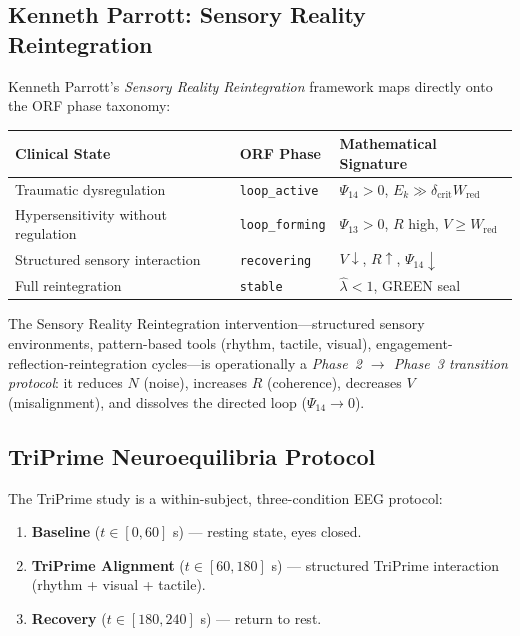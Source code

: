 \documentclass[12pt,a4paper]{article}
\theoremstyle{plain}
\theoremstyle{definition}
\newcommand{\hatlambda}{\hat{\lambda}}
\renewcommand{\Psi}{\varPsi}
\begin{document}
\subsection{Kenneth Parrott: Sensory Reality Reintegration}
\label{sec:clinical:srr}

Kenneth Parrott's \emph{Sensory Reality Reintegration} framework maps directly onto the
ORF phase taxonomy:

\begin{center}
\begin{tabular}{@{}lll@{}}
  \toprule
  Clinical State & ORF Phase & Mathematical Signature \\
  \midrule
  Traumatic dysregulation & \texttt{loop\_active} & $\Psi_{14} > 0$, $E_k \gg \delta_{\mathrm{crit}} W_{\mathrm{red}}$ \\
  Hypersensitivity without regulation & \texttt{loop\_forming} & $\Psi_{13} > 0$, $R$ high, $V \geq W_{\mathrm{red}}$ \\
  Structured sensory interaction & \texttt{recovering} & $V\downarrow$, $R\uparrow$, $\Psi_{14}\downarrow$ \\
  Full reintegration & \texttt{stable} & $\hatlambda < 1$, GREEN seal \\
  \bottomrule
\end{tabular}
\end{center}

\noindent The Sensory Reality Reintegration intervention---structured sensory environments,
pattern-based tools (rhythm, tactile, visual), engagement-reflection-reintegration
cycles---is operationally a \emph{Phase~2 $\to$ Phase~3 transition protocol}: it
reduces $N$ (noise), increases $R$ (coherence), decreases $V$ (misalignment), and
dissolves the directed loop ($\Psi_{14} \to 0$).

\subsection{TriPrime Neuroequilibria Protocol}
\label{sec:clinical:triprime}

The TriPrime study is a within-subject, three-condition EEG protocol:
\begin{enumerate}[label=\textbf{C\arabic*.}]
  \item \textbf{Baseline} ($t \in [0, 60]$ s) --- resting state, eyes closed.
  \item \textbf{TriPrime Alignment} ($t \in [60, 180]$ s) --- structured TriPrime
        interaction (rhythm + visual + tactile).
  \item \textbf{Recovery} ($t \in [180, 240]$ s) --- return to rest.
\end{enumerate}
\end{document}
